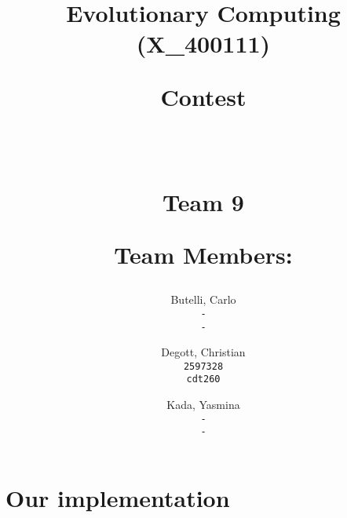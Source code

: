 \documentclass[11pt,a4paper]{article}
\title{
\large{Evolutionary Computing (X\_400111)}\\
	\vspace{8mm}
	\begin{Huge} Contest \end{Huge}\\
	\vspace{3mm}
	\begin{huge} Team 9\\
	\end{huge}
	\vspace{5mm}
	\center\textbf{Team Members:}
}
\date{\begin{flushright}\today\end{flushright}}
\author{
  Butelli, Carlo\\
  \texttt{-}\\
  \texttt{-}
  \and
  Degott, Christian\\
  \texttt{2597328}\\
  \texttt{cdt260}
   \and
  Kada, Yasmina\\
  \texttt{-}\\
  \texttt{-}
}
\begin{document}
\maketitle

\begin{flushleft}
\end{flushleft}

\thispagestyle{empty}

\newpage

\section{Our implementation}
\end{document}
